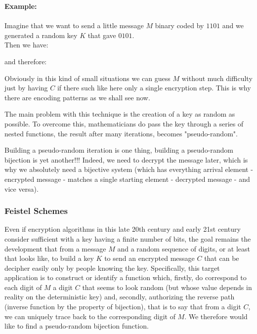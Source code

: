 	\begin{tcolorbox}[colframe=black,colback=white,sharp corners]
	\textbf{{\Large {}}Example:}\\\\
	Imagine that we want to send a little message $M$ binary coded by $1101$ and we generated a random key $K$ that gave $0101$.\\
	
	Then we have:
	
	and therefore:
	
	\end{tcolorbox}
	Obviously in this kind of small situations we can guess $M$ without much difficulty just by having $C$ if there such like here only a single encryption step. This is why there are encoding patterns as we shall see now.
	
	The main problem with this technique is the creation of a key as random as possible. To overcome this, mathematicians do pass the key through a series of nested functions, the result after many iterations, becomes "pseudo-random".
	
	Building a pseudo-random iteration is one thing, building a pseudo-random bijection is yet another!!! Indeed, we need to decrypt the message later, which is why we absolutely need a bijective system (which has everything arrival element - encrypted message - matches a single starting element - decrypted message - and vice versa).
	
	\subsubsection{Feistel Schemes}
	Even if encryption algorithms in this late 20th century and early 21st century consider sufficient with a key having a finite number of bits, the goal remains the development that from a message $M$ and a random sequence of digits, or at least that looks like, to build a key $K$ to send an encrypted message $C$ that can be decipher easily only by people knowing the key. Specifically, this target application is to construct or identify a function which, firstly, do correspond to each digit of $M$ a digit $C$ that seems to look random (but whose value depends in reality on the deterministic key) and, secondly, authorizing the reverse path (inverse function by the property of bijection), that is to say that from a digit $C$, we can uniquely trace back to the corresponding digit of $M$. We therefore would like to find a pseudo-random bijection function.
	
